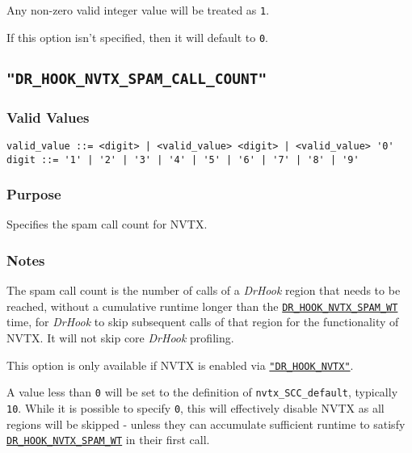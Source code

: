 Any non-zero valid integer value will be treated as \verb|1|.

If this option isn't specified, then it will default to \verb|0|.


\subsection{\texttt{"DR\_HOOK\_NVTX\_SPAM\_CALL\_COUNT"}}
\label{section:flags:DR_HOOK_NVTX_SPAM_CALL_COUNT}
\vspace{-2ex}
\subsubsection{Valid Values}
\vspace{-2ex}
\verb+valid_value ::= <digit> | <valid_value> <digit> | <valid_value> '0'+ \\
\verb+digit ::= '1' | '2' | '3' | '4' | '5' | '6' | '7' | '8' | '9'+

\vspace{-2ex}
\subsubsection{Purpose}
\vspace{-2ex}
Specifies the spam call count for NVTX.

\vspace{-2ex}
\subsubsection{Notes}
\vspace{-2ex}
The spam call count is the number of calls of a \textit{DrHook} region that needs to be reached, without a cumulative runtime longer than the \hyperref[section:flags:DR_HOOK_NVTX_SPAM_WT]{\texttt{DR\_HOOK\_NVTX\_SPAM\_WT}} time, for \textit{DrHook} to skip subsequent calls of that region for the functionality of NVTX. It will not skip core \textit{DrHook} profiling.

This option is only available if NVTX is enabled via \hyperref[section:flags:DR_HOOK_NVTX]{\texttt{"DR\_HOOK\_NVTX"}}.

A value less than \verb|0| will be set to the definition of \verb|nvtx_SCC_default|, typically \verb|10|. While it is possible to specify \verb|0|, this will effectively disable NVTX as all regions will be skipped - unless they can accumulate sufficient runtime to satisfy \hyperref[section:flags:DR_HOOK_NVTX_SPAM_WT]{\texttt{DR\_HOOK\_NVTX\_SPAM\_WT}} in their first call. 

